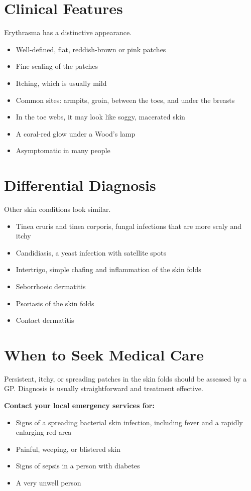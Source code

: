 \section*{Clinical Features}
Erythrasma has a distinctive appearance.
\begin{itemize}
    \item Well-defined, flat, reddish-brown or pink patches
    \item Fine scaling of the patches
    \item Itching, which is usually mild
    \item Common sites: armpits, groin, between the toes, and under the breasts
    \item In the toe webs, it may look like soggy, macerated skin
    \item A coral-red glow under a Wood's lamp
    \item Asymptomatic in many people
\end{itemize}

\section*{Differential Diagnosis}
Other skin conditions look similar.
\begin{itemize}
    \item Tinea cruris and tinea corporis, fungal infections that are more scaly and itchy
    \item Candidiasis, a yeast infection with satellite spots
    \item Intertrigo, simple chafing and inflammation of the skin folds
    \item Seborrhoeic dermatitis
    \item Psoriasis of the skin folds
    \item Contact dermatitis
\end{itemize}

\section*{When to Seek Medical Care}
Persistent, itchy, or spreading patches in the skin folds should be assessed by a GP. Diagnosis is usually straightforward and treatment effective.

\textbf{Contact your local emergency services for:}
\begin{itemize}
    \item Signs of a spreading bacterial skin infection, including fever and a rapidly enlarging red area
    \item Painful, weeping, or blistered skin
    \item Signs of sepsis in a person with diabetes
    \item A very unwell person
\end{itemize}

